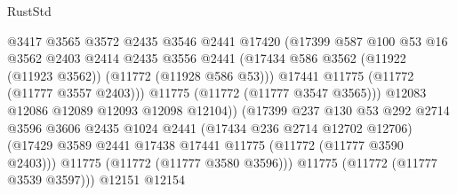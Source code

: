 \begin{lexlean}{RustStd}
\begin{coremodule}
                                    @3417
                                    @3565
                                    @3572
                                    @2435
                                    @3546
                                    @2441
                                    @17420
                                    (@17399
                                      @587
                                      @100
                                      @53
                                      @16
                                      @3562
                                      @2403
                                      @2414
                                      @2435
                                      @3556
                                      @2441
                                      (@17434
                                        @586
                                        @3562
                                        (@11922 (@11923 @3562))
                                        (@11772 (@11928 @586 @53)))
                                      @17441
                                      @11775
                                      (@11772 (@11777 @3557 @2403)))
                                    @11775
                                    (@11772 (@11777 @3547 @3565)))
                                  @12083
                                  @12086
                                  @12089
                                  @12093
                                  @12098
                                  @12104))
                              (@17399
                                @237
                                @130
                                @53
                                @292
                                @2714
                                @3596
                                @3606
                                @2435
                                @1024
                                @2441
                                (@17434 @236 @2714 @12702 @12706)
                                (@17429
                                  @3589
                                  @2441
                                  @17438
                                  @17441
                                  @11775
                                  (@11772 (@11777 @3590 @2403)))
                                @11775
                                (@11772 (@11777 @3580 @3596)))
                              @11775
                              (@11772 (@11777 @3539 @3597)))
                            @12151
                            @12154

\end{coremodule}
\end{lexlean}
